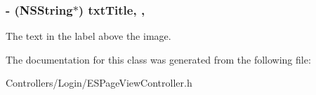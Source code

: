 \subsubsection[{txt\+Title}]{\setlength{\rightskip}{0pt plus 5cm}-\/ (N\+S\+String$\ast$) txt\+Title\hspace{0.3cm}{\ttfamily [read]}, {\ttfamily [write]}, {\ttfamily [atomic]}}\label{interface_e_s_page_view_controller_a6bdeac95e5afc8ef09c069a9d32e80bc}
The text in the label above the image. 

The documentation for this class was generated from the following file\+:\begin{DoxyCompactItemize}
\item 
Controllers/\+Login/E\+S\+Page\+View\+Controller.\+h\end{DoxyCompactItemize}

